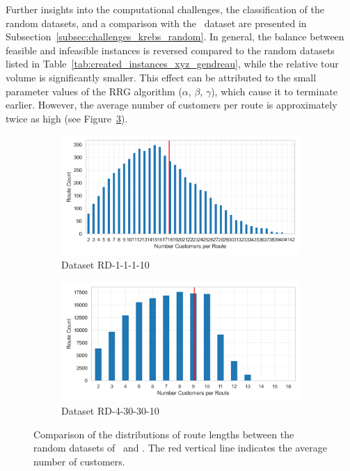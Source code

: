 Further insights into the computational challenges, the classification of the random datasets, and a comparison with the
\gendreauDataSetText~dataset are presented in Subsection~\ref{subsec:challenges_krebs_random}. In general, the balance between
feasible and infeasible instances is reversed compared to the random datasets listed in Table~\ref{tab:created_instances_xyz_gendreau},
while the relative tour volume is significantly smaller. This effect can be attributed to the small parameter values of the \gls{RRG}
algorithm ($\alpha$, $\beta$, $\gamma$), which cause it to terminate earlier. However, the average number of customers per route
is approximately twice as high (see Figure~\ref{fig:route_cust_no_krebs_new}).

\begin{figure}[ht]
    \centering
    \begin{subfigure}[t]{.5\textwidth}
        \centering
        \includegraphics[width=\linewidth]{pictures/dataset_structure/no_cust_plot_RandomData_1_1_1_10.png}
        \caption{Dataset RD-1-1-1-10}
        \label{fig:ds-a-krebs_lop}
    \end{subfigure}%
    \begin{subfigure}[t]{.5\textwidth}
        \centering
        \includegraphics[width=\linewidth]{pictures/dataset_structure/no_cust_plot_RandomData_4_30_30_10.png}
        \caption{Dataset RD-4-30-30-10}
        \label{fig:ds-b-krebs_luf}
    \end{subfigure}
    \caption[Comparison of the distributions of route lengths between the random datasets of \krebsADataSetText~and \gendreauDataSetText]
    {Comparison of the distributions of route lengths between the random datasets of \krebsADataSetText~and \gendreauDataSetText. The red vertical line indicates the average number of customers.}
    \label{fig:route_cust_no_krebs_new}
\end{figure}

